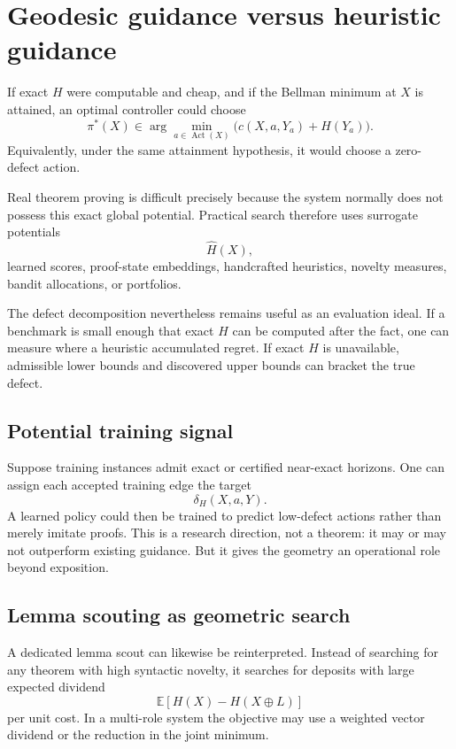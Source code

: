 \documentclass[11pt]{article}
\theoremstyle{remark}
\newcommand{\Act}{\operatorname{Act}}
\begin{document}
\section{Geodesic guidance versus heuristic guidance}

If exact $H$ were computable and cheap, and if the Bellman minimum at $X$ is attained, an optimal controller could choose
\[
\pi^*(X)\in\arg\min_{a\in\Act(X)}\bigl(c(X,a,Y_a)+H(Y_a)\bigr).
\]
Equivalently, under the same attainment hypothesis, it would choose a zero-defect action.

Real theorem proving is difficult precisely because the system normally does not possess this exact global potential. Practical search therefore uses surrogate potentials
\[
\widehat H(X),
\]
learned scores, proof-state embeddings, handcrafted heuristics, novelty measures, bandit allocations, or portfolios.

The defect decomposition nevertheless remains useful as an evaluation ideal. If a benchmark is small enough that exact $H$ can be computed after the fact, one can measure where a heuristic accumulated regret. If exact $H$ is unavailable, admissible lower bounds and discovered upper bounds can bracket the true defect.

\subsection{Potential training signal}

Suppose training instances admit exact or certified near-exact horizons. One can assign each accepted training edge the target
\[
\delta_H(X,a,Y).
\]
A learned policy could then be trained to predict low-defect actions rather than merely imitate proofs. This is a research direction, not a theorem: it may or may not outperform existing guidance. But it gives the geometry an operational role beyond exposition.

\subsection{Lemma scouting as geometric search}

A dedicated lemma scout can likewise be reinterpreted. Instead of searching for any theorem with high syntactic novelty, it searches for deposits with large expected dividend
\[
\mathbb E\left[H(X)-H(X\oplus L)\right]
\]
per unit cost. In a multi-role system the objective may use a weighted vector dividend or the reduction in the joint minimum.
\end{document}
